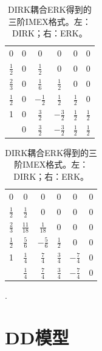 \begin{table}
    \centering
    \begin{minipage}{0.45\linewidth}
        \centering
        \begin{tabular}{c|ccccc}
            0             & 0 & 0              & 0              & 0             & 0             \\
            $\frac{1}{2}$ & 0 & $\frac{1}{2}$  & 0              & 0             & 0             \\
            $\frac{2}{3}$ & 0 & $\frac{1}{6}$  & $\frac{1}{2}$  & 0             & 0             \\
            $\frac{1}{2}$ & 0 & $-\frac{1}{2}$ & $\frac{1}{2}$  & $\frac{1}{2}$ & 0             \\
            1             & 0 & $\frac{3}{2}$  & $-\frac{3}{2}$ & $\frac{1}{2}$ & $\frac{1}{2}$ \\
            \hline
                          & 0 & $\frac{3}{2}$  & $-\frac{3}{2}$ & $\frac{1}{2}$ & $\frac{1}{2}$
        \end{tabular}
    \end{minipage}
    \begin{minipage}{0.45\linewidth}
        \centering
        \begin{tabular}{c|ccccc}
            0             & 0               & 0              & 0             & 0              & 0 \\
            $\frac{1}{2}$ & $\frac{1}{2}$   & 0              & 0             & 0              & 0 \\
            $\frac{2}{3}$ & $\frac{11}{18}$ & $\frac{1}{18}$ & 0             & 0              & 0 \\
            $\frac{1}{2}$ & $\frac{5}{6}$   & $-\frac{5}{6}$ & $\frac{1}{2}$ & 0              & 0 \\
            1             & $\frac{1}{4}$   & $\frac{7}{4}$  & $\frac{3}{4}$ & $-\frac{7}{4}$ & 0 \\
            \hline
                          & $\frac{1}{4}$   & $\frac{7}{4}$  & $\frac{3}{4}$ & $-\frac{7}{4}$ & 0
        \end{tabular}.
    \end{minipage}
    \caption{DIRK耦合ERK得到的三阶IMEX格式。左：DIRK；右：ERK。}
    \label{tab:IMEX:3}
\end{table}

\section{DD模型}


